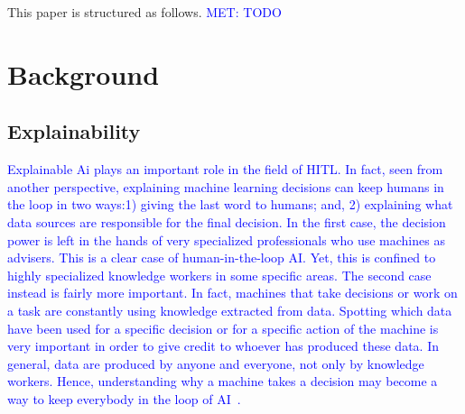 \documentclass[twoside,11pt]{article}
\newcommand{\sd}[1]{\textcolor{red}{[#1 \textsc{--Srijita}]}}
\newcommand{\MET}[1]{\textcolor{blue}{MET: #1}}
\begin{document}



This paper is structured as follows. \MET{TODO}

\section{Background}
\label{sec:background}

\subsection{Explainability}

\textcolor{blue}{Explainable Ai plays an important role in the field of HITL. In fact, seen from another perspective, explaining machine learning decisions can keep humans in the loop in two ways:1) giving the last word to humans; and, 2) explaining what data sources are responsible for the final decision.  In the first case, the decision power is left in the hands of very specialized professionals who use machines as advisers.  This is a clear case of human-in-the-loop AI. Yet,  this is confined to highly specialized knowledge workers in some specific areas.  The second case instead is fairly more important.  In fact, machines that take decisions or work on a task are constantly using knowledge extracted from data.  Spotting which data have been used for a specific decision or for a specific action of the machine is very important in order to give credit to whoever has produced these data.  In general, data are produced by anyone and everyone, not only by knowledge workers.  Hence, understanding why a machine takes a decision may become a way to keep everybody in the loop of AI~\cite{zanzotto2019human}.}
\end{document}
